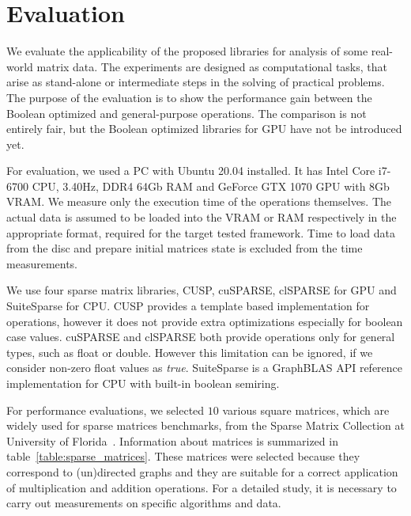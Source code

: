 \section{Evaluation}



We evaluate the applicability of the proposed libraries for analysis of some real-world matrix data.
The experiments are designed as computational tasks, that arise as stand-alone or intermediate steps in the solving of practical problems. 
The purpose of the evaluation is to show the performance gain between the Boolean optimized and general-purpose operations. 
The comparison is not entirely fair, but the Boolean optimized libraries for GPU have not be introduced yet.


For evaluation, we used a PC with Ubuntu 20.04 installed.
It has Intel Core i7-6700 CPU, 3.40Hz, DDR4 64Gb RAM and GeForce GTX 1070 GPU with 8Gb VRAM.
We measure only the execution time of the operations themselves.
The actual data is assumed to be loaded into the VRAM or RAM respectively in the appropriate format, required for the target tested framework.
Time to load data from the disc and prepare initial matrices state is excluded from the time measurements.

We use four sparse matrix libraries, CUSP, cuSPARSE, clSPARSE for GPU and SuiteSparse for CPU.
CUSP provides a template based implementation for operations, however it does not provide extra optimizations especially for boolean case values. cuSPARSE and clSPARSE both provide operations only for general types, such as float or double.
However this limitation can be ignored, if we consider non-zero float values as \textit{true}.
SuiteSparse is a GraphBLAS API reference implementation for CPU with built-in boolean semiring.

For performance evaluations, we selected $10$ various square matrices, which are widely used for sparse matrices benchmarks, from the Sparse Matrix Collection at University of Florida~\cite{data:suitesparse_matrix_collection}.
Information about matrices is summarized in table~\ref{table:sparse_matrices}.
These matrices were selected because they correspond to (un)directed graphs 
and they are suitable for a correct application of multiplication and addition operations. 
For a detailed study, it is necessary to carry out measurements on specific algorithms and data. 

